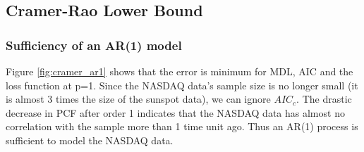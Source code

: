 \documentclass{article}
\begin{document}
\subsection{Cramer-Rao Lower Bound} %

\subsubsection{Sufficiency of an AR(1) model}

Figure \ref{fig:cramer_ar1} shows that the error is minimum for MDL, AIC and the loss function at p=1. Since the NASDAQ data's sample size is no longer small (it is almost 3 times the size of the sunspot data), we can ignore $AIC_c$. The drastic decrease in PCF after order 1 indicates that the NASDAQ data has almost no correlation with the sample more than 1 time unit ago. Thus an AR(1) process is sufficient to model the NASDAQ data.
\end{document}

